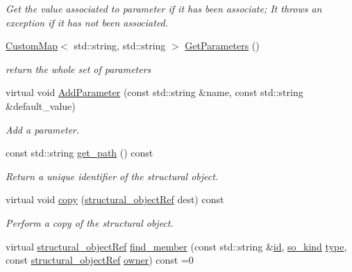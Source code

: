 \begin{DoxyCompactItemize}
\begin{DoxyCompactList}\small\item\em Get the value associated to parameter if it has been associate; It throws an exception if it has not been associated. \end{DoxyCompactList}\item 
\hyperlink{custom__map_8hpp_a18ca01763abbe3e5623223bfe5aaac6b}{Custom\+Map}$<$ std\+::string, std\+::string $>$ \hyperlink{classstructural__object_a3319b409440f03f4e953b7c48f9aea25}{Get\+Parameters} ()
\begin{DoxyCompactList}\small\item\em return the whole set of parameters \end{DoxyCompactList}\item 
virtual void \hyperlink{classstructural__object_a83ccf7f94a7c5d4590f337ff2b97c5b3}{Add\+Parameter} (const std\+::string \&name, const std\+::string \&default\+\_\+value)
\begin{DoxyCompactList}\small\item\em Add a parameter. \end{DoxyCompactList}\item 
const std\+::string \hyperlink{classstructural__object_a08b6790c882b985060c53e32d695799b}{get\+\_\+path} () const
\begin{DoxyCompactList}\small\item\em Return a unique identifier of the structural object. \end{DoxyCompactList}\item 
virtual void \hyperlink{classstructural__object_a6566435c67934f6b4ff1b319c0682b18}{copy} (\hyperlink{structural__objects_8hpp_a8ea5f8cc50ab8f4c31e2751074ff60b2}{structural\+\_\+object\+Ref} dest) const
\begin{DoxyCompactList}\small\item\em Perform a copy of the structural object. \end{DoxyCompactList}\item 
virtual \hyperlink{structural__objects_8hpp_a8ea5f8cc50ab8f4c31e2751074ff60b2}{structural\+\_\+object\+Ref} \hyperlink{classstructural__object_a3a8b2d38c2b5666700053a72868bb6b2}{find\+\_\+member} (const std\+::string \&\hyperlink{classstructural__object_a841a75f6e349ff7c1987dc92d4ac33a6}{id}, \hyperlink{structural__objects_8hpp_acf52399aecacb7952e414c5746ce6439}{so\+\_\+kind} \hyperlink{classstructural__object_a9a7159ce4c8da9984f256d9032f49778}{type}, const \hyperlink{structural__objects_8hpp_a8ea5f8cc50ab8f4c31e2751074ff60b2}{structural\+\_\+object\+Ref} \hyperlink{classstructural__object_a3e96b3e00b8a78adfc44872d82e186ea}{owner}) const =0

\end{DoxyCompactItemize}
